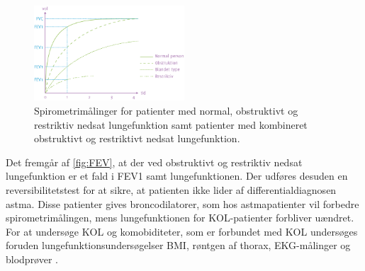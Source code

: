 \begin{figure} [H]
\centering
\includegraphics[width=0.5\textwidth]{figures/FEV}
\caption{Spirometrimålinger for patienter med normal, obstruktivt og restriktiv nedsat lungefunktion samt patienter med kombineret obstruktivt og restriktivt nedsat lungefunktion.}
\label{fig:FEV}
\end{figure} 

\noindent
Det fremgår af \autoref{fig:FEV}, at der ved obstruktivt og restriktiv nedsat lungefunktion er et fald i FEV1 samt lungefunktionen. Der udføres desuden en reversibilitetstest for at sikre, at patienten ikke lider af differentialdiagnosen astma. Disse patienter gives broncodilatorer, som hos astmapatienter vil forbedre spirometrimålingen, mens lungefunktionen for KOL-patienter forbliver uændret.\cite{Basisbogen2016, Sundhed2013} 
For at undersøge KOL og komobiditeter, som er forbundet med KOL undersøges foruden lungefunktionsundersøgelser BMI, røntgen af thorax, EKG-målinger og blodprøver \cite{Sundhed2013}. 
